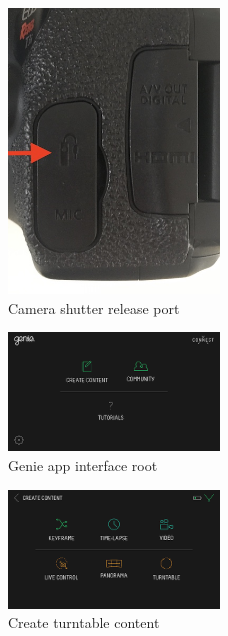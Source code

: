 \documentclass[
]{book}
\begin{document}
\begin{figure}
\hypertarget{fig:shutter}{%
\centering
\includegraphics[width=0.5\textwidth,height=\textheight]{Figures/shutter.jpg}
\caption{Camera shutter release port}\label{fig:shutter}
}
\end{figure}

\begin{figure}
\hypertarget{genie_root}{%
\centering
\includegraphics[width=0.5\textwidth,height=\textheight]{Figures/genie_root.PNG}
\caption{Genie app interface root}\label{genie_root}
}
\end{figure}

\begin{figure}
\hypertarget{genie_content}{%
\centering
\includegraphics[width=0.5\textwidth,height=\textheight]{Figures/genie_create.PNG}
\caption{Create turntable content}\label{genie_content}
}
\end{figure}
\end{document}
